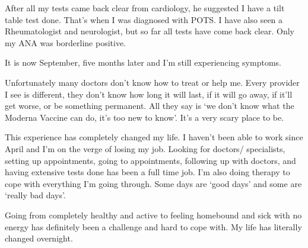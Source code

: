 After all my tests came back clear from cardiology, he suggested I have a tilt
table test done. That’s when I was diagnosed with POTS. I have also seen a
Rheumatologist and neurologist, but so far all tests have come back clear. Only
my ANA was borderline positive.

It is now September, five months later and I’m still experiencing symptoms.

Unfortunately many doctors don’t know how to treat or help me. Every provider I
see is different, they don’t know how long it will last, if it will go away, if
it’ll get worse, or be something permanent. All they say is ‘we don’t know what
the Moderna Vaccine can do, it’s too new to know’. It’s a very scary place to
be.

This experience has completely changed my life. I haven’t been able to work
since April and I’m on the verge of losing my job. Looking for doctors/
specialists, setting up appointments, going to appointments, following up with
doctors, and having extensive tests done has been a full time job. I’m also
doing therapy to cope with everything I’m going through. Some days are ‘good
days’ and some are ‘really bad days’.

Going from completely healthy and active to feeling homebound and sick with no
energy has definitely been a challenge and hard to cope with. My life has
literally changed overnight.
